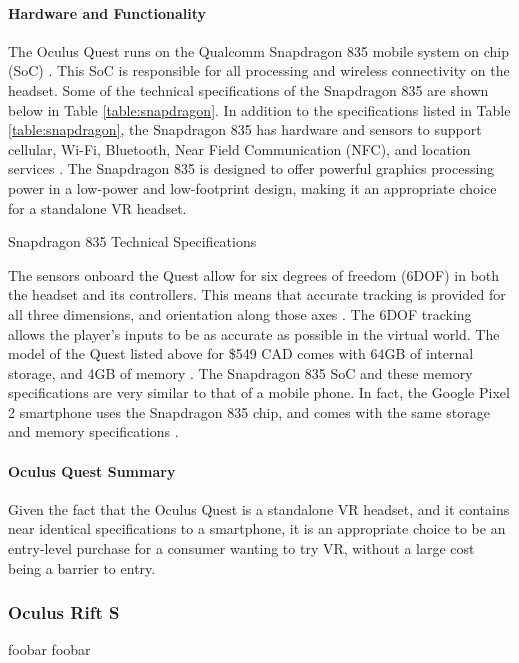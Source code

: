 \paragraph{Hardware and Functionality}
The Oculus Quest runs on the Qualcomm Snapdragon 835 mobile system on chip (SoC) \cite{oculus_dev_page}.
This SoC is responsible for all processing and wireless connectivity on the headset. Some 
of the technical specifications of the Snapdragon 835 are shown
below in Table \ref{table:snapdragon}. In addition to the specifications listed in Table
\ref{table:snapdragon}, the Snapdragon 835 has hardware and sensors to support
cellular, Wi-Fi, Bluetooth, Near Field Communication (NFC), and location services
\cite{snapdragon_835}. The Snapdragon 835 is designed to offer powerful graphics
processing power in a low-power and low-footprint design, making it an appropriate
choice for a standalone VR headset.

\begin{table}[h]
    \centering
    \caption{Snapdragon 835 Technical Specifications}
    \label{table:snapdragon} 
\end{table}

The sensors onboard the Quest allow for six degrees of freedom (6DOF) in both the headset
and its controllers. This means that accurate tracking is provided for all three dimensions,
and orientation along those axes \cite{sixdof_defn}. The 6DOF tracking allows the player's
inputs to be as accurate as possible in the virtual world. The model of the Quest 
listed above for \$549 CAD comes with 64GB of internal storage, and 4GB of memory
\cite{quest_timemag}. The Snapdragon 835 SoC and these memory specifications
are very similar to that of a mobile phone. In fact, the Google Pixel 2 smartphone
uses the Snapdragon 835 chip, and comes with the same storage and memory
specifications \cite{quest_polygon}.

\paragraph{Oculus Quest Summary}
Given the fact that the Oculus Quest is a standalone VR headset, and it contains
near identical specifications to a smartphone, it is an appropriate choice to
be an entry-level purchase for a consumer wanting to try VR, without a large
cost being a barrier to entry.

\subsubsection{Oculus Rift S}
foobar foobar

